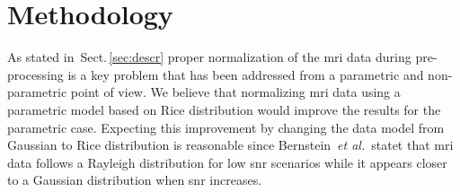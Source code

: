 \section{Methodology}
\label{sec:method}
\graphicspath{ {./content/method/figures/} }


As stated in~Sect.\,\ref{sec:descr} proper normalization of the \ac{mri} data during pre-processing is a key problem that has been addressed from a parametric and non-parametric point of view.
We believe that normalizing \ac{mri} data using a parametric model based on Rice distribution would improve the results for the parametric case.
Expecting this improvement by changing the data model from Gaussian to Rice distribution is reasonable since Bernstein~\emph{et al.}\,\cite{bernstein1989improved} statet that \ac{mri} data follows a Rayleigh distribution for low \ac{snr} scenarios while it appears closer to a Gaussian distribution when \ac{snr} increases.

